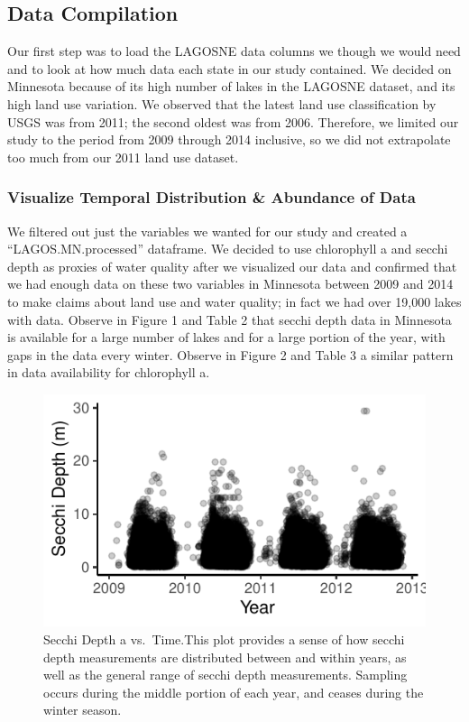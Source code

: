 \documentclass[12pt,]{article}
\begin{document}
\hypertarget{data-compilation}{%
\subsection{Data Compilation}\label{data-compilation}}

Our first step was to load the LAGOSNE data columns we though we would
need and to look at how much data each state in our study contained. We
decided on Minnesota because of its high number of lakes in the LAGOSNE
dataset, and its high land use variation. We observed that the latest
land use classification by USGS was from 2011; the second oldest was
from 2006. Therefore, we limited our study to the period from 2009
through 2014 inclusive, so we did not extrapolate too much from our 2011
land use dataset.

\hypertarget{visualize-temporal-distribution-abundance-of-data}{%
\subsubsection{Visualize Temporal Distribution \& Abundance of
Data}\label{visualize-temporal-distribution-abundance-of-data}}

We filtered out just the variables we wanted for our study and created a
``LAGOS.MN.processed'' dataframe. We decided to use chlorophyll a and
secchi depth as proxies of water quality after we visualized our data
and confirmed that we had enough data on these two variables in
Minnesota between 2009 and 2014 to make claims about land use and water
quality; in fact we had over 19,000 lakes with data. Observe in Figure 1
and Table 2 that secchi depth data in Minnesota is available for a large
number of lakes and for a large portion of the year, with gaps in the
data every winter. Observe in Figure 2 and Table 3 a similar pattern in
data availability for chlorophyll a.

\begin{figure}
\centering
\includegraphics{Bollt_Greif_Raby_Roth_Project_Final_files/figure-latex/Visualize_data-1.pdf}
\caption{Secchi Depth a vs.~Time.This plot provides a sense of how
secchi depth measurements are distributed between and within years, as
well as the general range of secchi depth measurements. Sampling occurs
during the middle portion of each year, and ceases during the winter
season.}
\end{figure}
\end{document}
